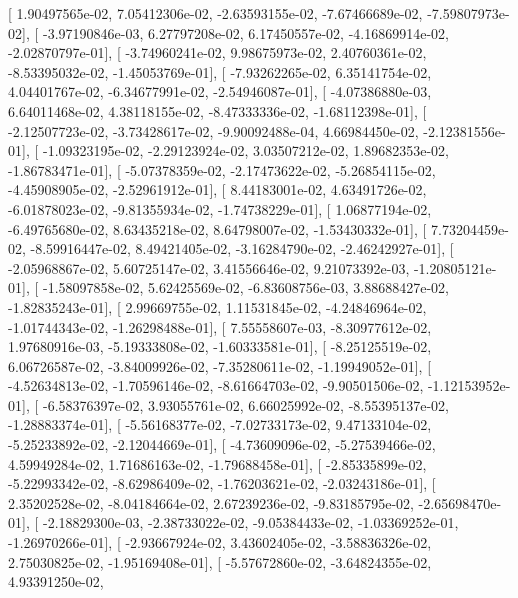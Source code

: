\documentclass{article}
\begin{document}
       [  1.90497565e-02,   7.05412306e-02,  -2.63593155e-02,
         -7.67466689e-02,  -7.59807973e-02],
       [ -3.97190846e-03,   6.27797208e-02,   6.17450557e-02,
         -4.16869914e-02,  -2.02870797e-01],
       [ -3.74960241e-02,   9.98675973e-02,   2.40760361e-02,
         -8.53395032e-02,  -1.45053769e-01],
       [ -7.93262265e-02,   6.35141754e-02,   4.04401767e-02,
         -6.34677991e-02,  -2.54946087e-01],
       [ -4.07386880e-03,   6.64011468e-02,   4.38118155e-02,
         -8.47333336e-02,  -1.68112398e-01],
       [ -2.12507723e-02,  -3.73428617e-02,  -9.90092488e-04,
          4.66984450e-02,  -2.12381556e-01],
       [ -1.09323195e-02,  -2.29123924e-02,   3.03507212e-02,
          1.89682353e-02,  -1.86783471e-01],
       [ -5.07378359e-02,  -2.17473622e-02,  -5.26854115e-02,
         -4.45908905e-02,  -2.52961912e-01],
       [  8.44183001e-02,   4.63491726e-02,  -6.01878023e-02,
         -9.81355934e-02,  -1.74738229e-01],
       [  1.06877194e-02,  -6.49765680e-02,   8.63435218e-02,
          8.64798007e-02,  -1.53430332e-01],
       [  7.73204459e-02,  -8.59916447e-02,   8.49421405e-02,
         -3.16284790e-02,  -2.46242927e-01],
       [ -2.05968867e-02,   5.60725147e-02,   3.41556646e-02,
          9.21073392e-03,  -1.20805121e-01],
       [ -1.58097858e-02,   5.62425569e-02,  -6.83608756e-03,
          3.88688427e-02,  -1.82835243e-01],
       [  2.99669755e-02,   1.11531845e-02,  -4.24846964e-02,
         -1.01744343e-02,  -1.26298488e-01],
       [  7.55558607e-03,  -8.30977612e-02,   1.97680916e-03,
         -5.19333808e-02,  -1.60333581e-01],
       [ -8.25125519e-02,   6.06726587e-02,  -3.84009926e-02,
         -7.35280611e-02,  -1.19949052e-01],
       [ -4.52634813e-02,  -1.70596146e-02,  -8.61664703e-02,
         -9.90501506e-02,  -1.12153952e-01],
       [ -6.58376397e-02,   3.93055761e-02,   6.66025992e-02,
         -8.55395137e-02,  -1.28883374e-01],
       [ -5.56168377e-02,  -7.02733173e-02,   9.47133104e-02,
         -5.25233892e-02,  -2.12044669e-01],
       [ -4.73609096e-02,  -5.27539466e-02,   4.59949284e-02,
          1.71686163e-02,  -1.79688458e-01],
       [ -2.85335899e-02,  -5.22993342e-02,  -8.62986409e-02,
         -1.76203621e-02,  -2.03243186e-01],
       [  2.35202528e-02,  -8.04184664e-02,   2.67239236e-02,
         -9.83185795e-02,  -2.65698470e-01],
       [ -2.18829300e-03,  -2.38733022e-02,  -9.05384433e-02,
         -1.03369252e-01,  -1.26970266e-01],
       [ -2.93667924e-02,   3.43602405e-02,  -3.58836326e-02,
          2.75030825e-02,  -1.95169408e-01],
       [ -5.57672860e-02,  -3.64824355e-02,   4.93391250e-02,
\end{document}
